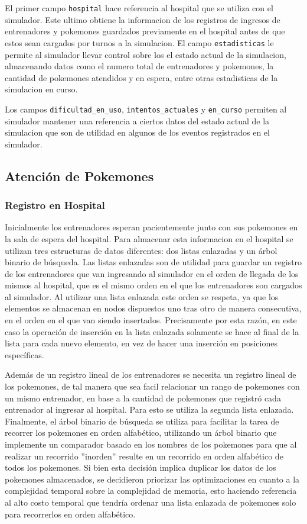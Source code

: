 \documentclass[titlepage,a4paper]{article}
\begin{document}
El primer campo \lstinline{hospital} hace referencia al hospital que se utiliza
con el simulador. Este ultimo obtiene la informacion de los registros de
ingresos de entrenadores y pokemones guardados previamente en el hospital antes
de que estos sean cargados por turnos a la simulacion. El campo
\lstinline{estadisticas} le permite al simulador llevar control sobre los
el estado actual de la simulacion, almacenando datos como el numero total de
entrenadores y pokemones, la cantidad de pokemones atendidos y en espera, entre
otras estadisticas de la simulacion en curso.

Los campos \lstinline{dificultad_en_uso}, \lstinline{intentos_actuales} y
\lstinline{en_curso} permiten al simulador mantener una referencia a ciertos
datos del estado actual de la simulacion que son de utilidad en algunos de los
eventos registrados en el simulador.

\subsection{Atención de Pokemones}

\subsubsection{Registro en Hospital}

Inicialmente los entrenadores esperan pacientemente junto con sus pokemones en
la sala de espera del hospital. Para almacenar esta informacion en el hospital
se utilizan tres estructuras de datos diferentes: dos listas enlazadas y un
árbol binario de búsqueda. Las listas enlazadas son de utilidad para guardar un
registro de los entrenadores que van ingresando al simulador en el orden de
llegada de los mismos al hospital, que es el mismo orden en el que los
entrenadores son cargados al simulador. Al utilizar una lista enlazada este
orden se respeta, ya que los elementos se almacenan en nodos dispuestos uno
tras otro de manera consecutiva, en el orden en el que van siendo insertados.
Precisamente por esta razón, en este caso la operación de inserción en la lista
enlazada solamente se hace al final de la lista para cada nuevo elemento, en vez
de hacer una inserción en posiciones específicas.

Además de un registro lineal de los entrenadores se necesita un registro lineal
de los pokemones, de tal manera que sea facil relacionar un rango de pokemones
con un mismo entrenador, en base a la cantidad de pokemones que registró cada
entrenador al ingresar al hospital. Para esto se utiliza la segunda lista
enlazada. Finalmente, el árbol binario de búsqueda se utiliza para facilitar
la tarea de recorrer los pokemones en orden alfabético, utilizando un árbol
binario que implemente un comparador basado en los nombres de los pokemones para
que al realizar un recorrido ''inorden'' resulte en un recorrido en orden
alfabético de todos los pokemones. Si bien esta decisión implica duplicar los
datos de los pokemones almacenados, se decidieron priorizar las optimizaciones
en cuanto a la complejidad temporal sobre la complejidad de memoria, esto
haciendo referencia al alto costo temporal que tendría ordenar una lista
enlazada de pokemones solo para recorrerlos en orden alfabético.
\end{document}
